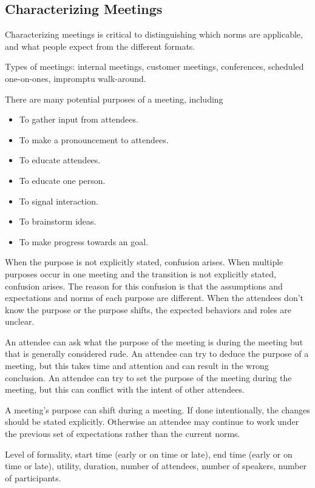 \subsection*{Characterizing Meetings}
Characterizing meetings is critical to distinguishing which norms are applicable, and what people expect from the different formats. 



Types of meetings: internal meetings, customer meetings, conferences, scheduled one-on-ones, impromptu walk-around.   


There are many potential purposes of a meeting, including
\begin{itemize}
    \item To gather input from attendees.
    \item To make a pronouncement to attendees.
    \item To educate attendees.
    \item To educate one person.
    \item To signal interaction.
    \item To brainstorm ideas.
    \item To make progress towards an goal.
\end{itemize}
When the purpose is not explicitly stated, confusion arises. 
When multiple purposes occur in one meeting and the transition is not explicitly stated, confusion arises.
The reason for this confusion is that the assumptions and expectations and norms of each purpose are different. When the attendees don't know the purpose or the purpose shifts, the expected behaviors and roles are unclear. 

An attendee can ask what the purpose of the meeting is during the meeting but that is generally considered rude. An attendee can try to deduce the purpose of a meeting, but this takes time and attention and can result in the wrong conclusion. An attendee can try to set the purpose of the meeting during the meeting, but this can conflict with the intent of other attendees. 

A meeting's purpose can shift during a meeting. If done intentionally, the changes should be stated explicitly. Otherwise an attendee may continue to work under the previous set of expectations rather than the current norms. 



Level of formality, start time (early or on time or late), 
end time (early or on time or late), utility, 
duration, number of attendees, number of speakers, number of participants.



